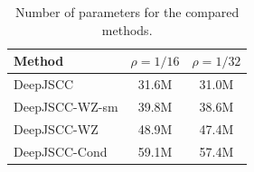 \begin{table}[h]
\centering
\caption{Number of parameters for the compared methods.}
\label{tab:num_parameters}
\begin{tabular}{lcc}
\toprule
Method & $\rho = 1/16$ & $\rho = 1/32$ \\
\midrule
DeepJSCC & 31.6M & 31.0M \\
DeepJSCC-WZ-sm & 39.8M & 38.6M \\
DeepJSCC-WZ & 48.9M & 47.4M \\
DeepJSCC-Cond & 59.1M & 57.4M \\
\bottomrule
\end{tabular}
\end{table}
